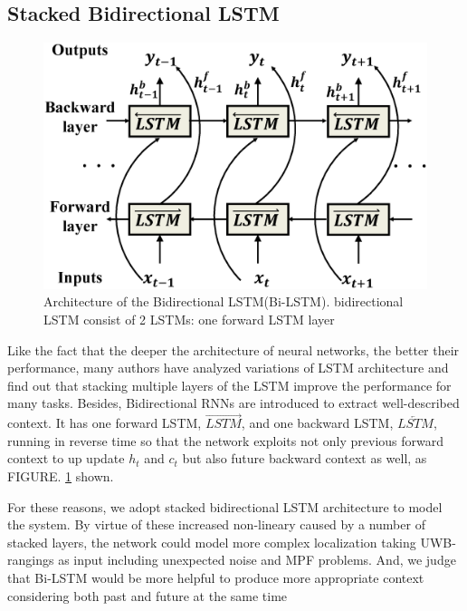 \documentclass[letterpaper, 10 pt, conference]{ieeeconf}  %
\begin{document}
\subsection{Stacked Bidirectional LSTM}

\begin{figure}[h!]
	\centering
	\includegraphics[width=.9\linewidth]{image/bidirectional_LSTM_revised}
	\caption{Architecture of the Bidirectional LSTM(Bi-LSTM). bidirectional LSTM consist of 2 LSTMs:  one forward LSTM layer}
	
	\label{fig:bidirectional_revised}	
\end{figure}

Like the fact that the deeper the architecture of neural networks, the better their performance\cite{simonyan2014very, he2016deep}, many authors have analyzed variations of LSTM architecture and find out that stacking multiple layers of the LSTM improve the performance for many tasks\cite{graves2013hybrid, graves2013speech,ullah2018action}. Besides, Bidirectional RNNs are introduced\cite{schuster1997bidirectional} to extract well-described context. It has one forward LSTM, $\overrightarrow{LSTM}$, and one backward LSTM, $\overleftarrow{LSTM}$, running in reverse time so that the network exploits not only previous forward context to up update $h_{t}$ and $c_{t}$ but also future backward context as well, as FIGURE. \ref{fig:bidirectional_revised} shown. 

For these reasons, we adopt stacked bidirectional LSTM architecture to model the system. By virtue of these increased non-lineary caused by a number of stacked layers, the network could model more complex localization taking UWB-rangings as input including unexpected noise and MPF problems. And, we judge that Bi-LSTM would be more helpful to produce more appropriate context considering both past and future at the same time
\end{document}
